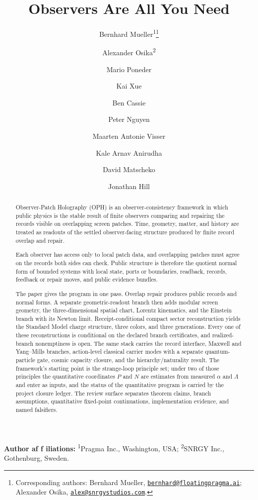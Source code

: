 \documentclass[11pt]{article}
\title{Observers Are All You Need}
\author{Bernhard Mueller\textsuperscript{1}\thanks{\protect\raggedright Corresponding authors: Bernhard Mueller,
\href{mailto:bernhard@floatingpragma.ai}{\texttt{bernhard@floatingpragma.ai}};
Alexander Osika, \href{mailto:alex@snrgystudios.com}{\texttt{alex@snrgystudios.com}}.}
\and Alexander Osika\textsuperscript{2} \and Mario Poneder \and Kai Xue \and Ben Cassie \and Peter Nguyen
\and Maarten Antonie Visser \and Kale Arnav Anirudha \and David Matscheko \and Jonathan Hill}
\date{\OPHPaperReleaseDate}
\newcounter{none}
\begin{document}
\maketitle
\OPHPaperReleaseBanner

\begin{center}
\small\textbf{Author af\kern0pt f\kern0pt iliations:} \textsuperscript{1}Pragma Inc., Washington, USA; \textsuperscript{2}SNRGY Inc., Gothenburg, Sweden.
\end{center}

\begin{abstract}
Observer-Patch Holography (OPH) is an observer-consistency framework in which
public physics is the stable result of finite observers comparing and repairing
the records visible on overlapping screen patches. Time, geometry, matter, and
history are treated as readouts of the settled observer-facing structure
produced by finite record overlap and repair.

Each observer has access only to local patch data, and overlapping patches must
agree on the records both sides can check. Public structure is therefore the
quotient normal form of bounded systems with
local state, ports or boundaries, readback, records, feedback or repair moves,
and public evidence bundles.

The paper gives the program in one pass. Overlap repair produces public records
and normal forms. A separate geometric-readout branch then adds modular screen
geometry, the three-dimensional spatial chart, Lorentz kinematics, and the
Einstein branch with its Newton limit.
Receipt-conditional compact sector reconstruction yields the Standard Model charge structure, three
colors, and three generations. Every one of these reconstructions is conditional
on the declared branch certificates, and realized-branch nonemptiness is open.
The same stack carries the record interface,
Maxwell and Yang--Mills branches, action-level classical carrier modes with a separate quantum-particle gate, cosmic
capacity closure, and the hierarchy/naturality result.
The framework's starting point is the strange-loop principle set;
under two of those principles the quantitative coordinates
\(P\) and \(N\) are estimates from measured \(\alpha\) and \(\Lambda\) and enter
as inputs, and the status of the quantitative program is carried by the project
closure ledger. The review surface
separates theorem claims, branch assumptions, quantitative fixed-point
continuations, implementation evidence, and named falsifiers.
\end{abstract}
\end{document}
